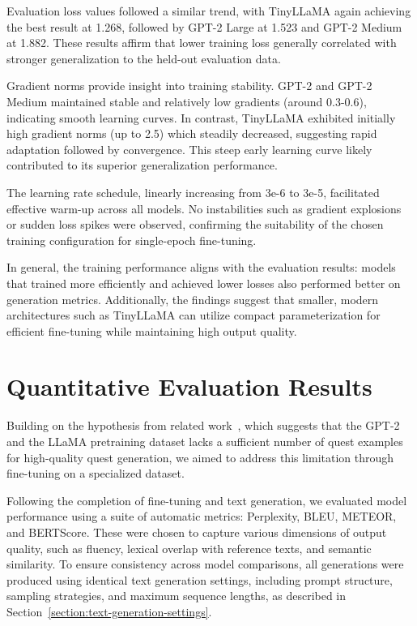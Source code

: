 Evaluation loss values followed a similar trend, with TinyLLaMA again achieving the
best result at 1.268, followed by GPT-2 Large at 1.523 and GPT-2 Medium at 1.882. These
results affirm that lower training loss generally correlated with stronger generalization to the
held-out evaluation data.

Gradient norms provide insight into training stability. GPT-2 and GPT-2 Medium
maintained stable and relatively low gradients (around 0.3-0.6), indicating smooth learning
curves. In contrast, TinyLLaMA exhibited initially high gradient norms (up to 2.5)
which steadily decreased, suggesting rapid adaptation followed by convergence. This steep
early learning curve likely contributed to its superior generalization performance.

The learning rate schedule, linearly increasing from 3e-6 to 3e-5, facilitated effective
warm-up across all models. No instabilities such as gradient explosions or sudden loss
spikes were observed, confirming the suitability of the chosen training configuration for
single-epoch fine-tuning.

In general, the training performance aligns with the evaluation results: models that
trained more efficiently and achieved lower losses also performed better on generation
metrics. Additionally, the findings suggest that smaller, modern architectures such as
TinyLLaMA can utilize compact parameterization for efficient fine-tuning while maintaining
high output quality.

\section{Quantitative Evaluation Results}

Building on the hypothesis from related work~\cite{van2021fine}, which suggests that the GPT-2 and
the LLaMA pretraining dataset lacks a sufficient number of quest examples for high-quality
quest generation, we aimed to address this limitation through fine-tuning on a
specialized dataset.

Following the completion of fine-tuning and text generation, we evaluated model
performance using a suite of automatic metrics: Perplexity, BLEU, METEOR, and
BERTScore. These were chosen to capture various dimensions of output quality, such
as fluency, lexical overlap with reference texts, and semantic similarity. To ensure consistency
across model comparisons, all generations were produced using identical text
generation settings, including prompt structure, sampling strategies, and maximum sequence
lengths, as described in Section~\ref{section:text-generation-settings}.

